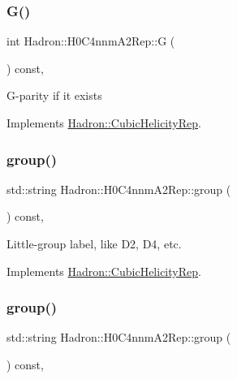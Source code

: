 \subsubsection{\texorpdfstring{G()}{G()}\hspace{0.1cm}{\footnotesize\ttfamily [3/3]}}
{\footnotesize\ttfamily int Hadron\+::\+H0\+C4nnm\+A2\+Rep\+::G (\begin{DoxyParamCaption}{ }\end{DoxyParamCaption}) const\hspace{0.3cm}{\ttfamily [inline]}, {\ttfamily [virtual]}}

G-\/parity if it exists 

Implements \mbox{\hyperlink{structHadron_1_1CubicHelicityRep_a50689f42be1e6170aa8cf6ad0597018b}{Hadron\+::\+Cubic\+Helicity\+Rep}}.

\mbox{\label{structHadron_1_1H0C4nnmA2Rep_a04d0d1b6a859d992423de875ce86f980}} 
\subsubsection{\texorpdfstring{group()}{group()}\hspace{0.1cm}{\footnotesize\ttfamily [1/5]}}
{\footnotesize\ttfamily std\+::string Hadron\+::\+H0\+C4nnm\+A2\+Rep\+::group (\begin{DoxyParamCaption}{ }\end{DoxyParamCaption}) const\hspace{0.3cm}{\ttfamily [inline]}, {\ttfamily [virtual]}}

Little-\/group label, like D2, D4, etc. 

Implements \mbox{\hyperlink{structHadron_1_1CubicHelicityRep_a101a7d76cd8ccdad0f272db44b766113}{Hadron\+::\+Cubic\+Helicity\+Rep}}.

\mbox{\label{structHadron_1_1H0C4nnmA2Rep_a04d0d1b6a859d992423de875ce86f980}} 
\subsubsection{\texorpdfstring{group()}{group()}\hspace{0.1cm}{\footnotesize\ttfamily [2/5]}}
{\footnotesize\ttfamily std\+::string Hadron\+::\+H0\+C4nnm\+A2\+Rep\+::group (\begin{DoxyParamCaption}{ }\end{DoxyParamCaption}) const\hspace{0.3cm}{\ttfamily [inline]}, {\ttfamily [virtual]}}

